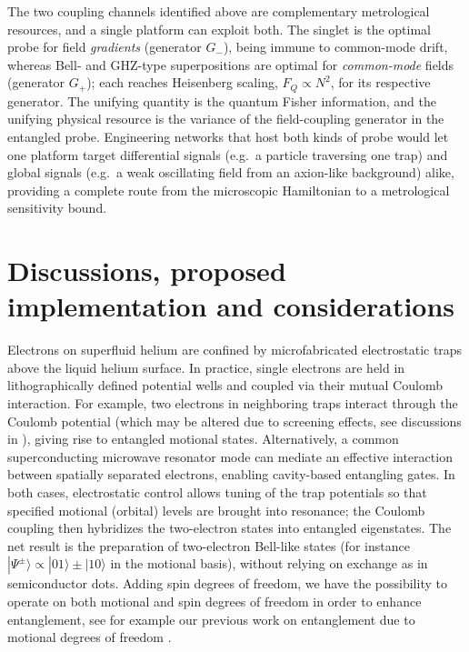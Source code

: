 \documentclass[fleqn,10pt]{wlscirep}
\begin{document}
The two coupling channels identified above are complementary metrological resources, and a single platform can exploit both. The singlet is the optimal probe for field \emph{gradients} (generator $G_-$), being immune to common-mode drift, whereas Bell- and GHZ-type superpositions are optimal for \emph{common-mode} fields (generator $G_+$); each reaches Heisenberg scaling, $F_Q\propto N^2$, for its respective generator. The unifying quantity is the quantum Fisher information, and the unifying physical resource is the variance of the field-coupling generator in the entangled probe. Engineering networks that host both kinds of probe would let one platform target differential signals (e.g.\ a particle traversing one trap) and global signals (e.g.\ a weak oscillating field from an axion-like background) alike, providing a complete route from the microscopic Hamiltonian to a metrological sensitivity bound.




\section{Discussions, proposed implementation and considerations}

Electrons on superfluid helium are confined by microfabricated electrostatic traps above the liquid helium surface.  In practice, single electrons are held in lithographically defined potential wells and coupled via their mutual Coulomb interaction.  For example, two electrons in neighboring traps interact through the Coulomb potential (which may be altered due to screening effects, see discussions in \cite{leinonen2025}),
giving rise to entangled motional states.  Alternatively, a common superconducting microwave resonator mode can mediate an effective interaction between spatially separated electrons, enabling cavity-based entangling gates.  In both cases, electrostatic control allows tuning of the trap potentials so that specified motional (orbital) levels are brought into resonance; the Coulomb coupling then hybridizes the two-electron states into entangled eigenstates.  The net result is the preparation of two-electron Bell-like states (for instance $|\Psi^\pm\rangle\propto|01\rangle\pm|10\rangle$ in the motional basis), without relying on exchange as in semiconductor dots. Adding spin degrees of freedom, we have the possibility to operate on both motional and spin degrees of freedom in order to enhance entanglement, see for example our previous work on entanglement due to motional degrees of freedom \cite{beysengulov2024,leinonen2025}.
\end{document}
